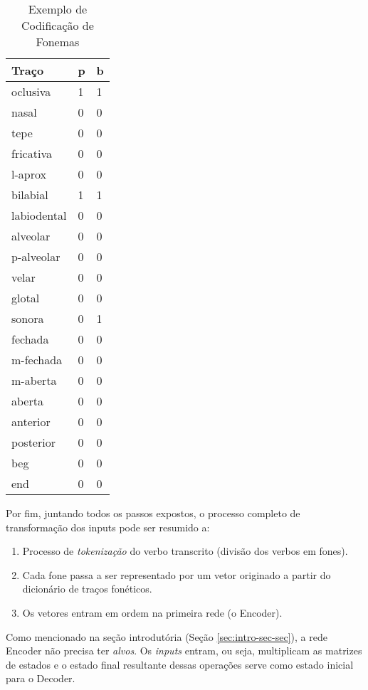 \begin{table}[H]
\begin{center}
\begin{tabular}{lll}
 Traço & p & b \\
 \toprule
oclusiva & 1 & 1 \\
nasal & 0 & 0 \\
tepe & 0 & 0 \\
fricativa & 0 & 0 \\
l-aprox & 0 & 0 \\
bilabial & 1 & 1 \\
labiodental & 0 & 0 \\
alveolar & 0 & 0 \\
p-alveolar & 0 & 0 \\
velar & 0 & 0 \\
glotal & 0 & 0 \\
sonora & 0 & 1 \\
fechada & 0 & 0 \\
m-fechada & 0 & 0 \\
m-aberta & 0 & 0 \\
aberta & 0 & 0 \\
anterior & 0 & 0 \\
posterior & 0 & 0 \\
\<beg\> & 0 & 0 \\
\<end\> & 0 & 0
\end{tabular}
\end{center}
\caption{Exemplo de Codificação de Fonemas}
\label{tab:coding_example}
\end{table}

Por fim, juntando todos os passos expostos, o processo completo de transformação dos inputs pode ser resumido a:

\begin{enumerate}
    \item Processo de \textit{tokenização} do verbo transcrito (divisão dos verbos em fones).
    \item Cada fone passa a ser representado por um vetor originado a partir do dicionário de traços fonéticos.
    \item Os vetores entram em ordem na primeira rede (o Encoder).
\end{enumerate}

Como mencionado na seção introdutória (Seção \ref{sec:intro-sec-sec}), a rede Encoder não precisa ter \textit{alvos}. Os \textit{inputs} entram, ou seja, multiplicam as matrizes de estados e o estado final resultante dessas operações serve como estado inicial para o Decoder. 

